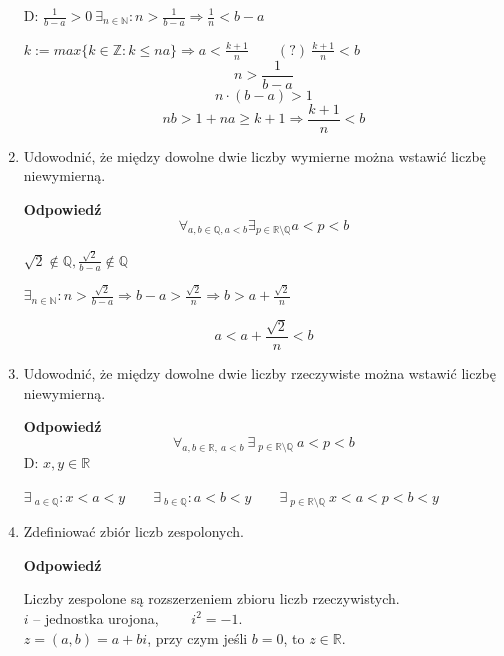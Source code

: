 \documentclass[12pt,a4paper]{article}
\theoremstyle{break}
\newcommand{\Odp}[1]{
		\begin{mdframed}[style=zadanie]
			\textbf{Odpowiedź}\\
			#1
		\end{mdframed}
	}
\begin{document}
\begin{enumerate}[1.]
{		D: $\frac{1}{b-a}>0\: \exists_{n\in\mathbb{N}}: n>\frac{1}{b-a} \Rightarrow \frac{1}{n}<b-a$
		
		$k:=max\{k\in\mathbb{Z}: k\leq na\} \Rightarrow a<\frac{k+1}{n}\qquad (?)\: \frac{k+1}{n}<b$
		$$n>\frac{1}{b-a}$$
		$$n\cdot(b-a)>1$$
		$$nb>1+na\geq k+1 \Rightarrow \frac{k+1}{n}<b$$
		 
	}
	\newpage
	\item Udowodnić, że między dowolne dwie liczby wymierne można wstawić liczbę niewymierną.
	\Odp{
		$$\forall_{a,b\in \mathbb{Q}, a<b} \exists_{p\in \mathbb{R}\setminus\mathbb{Q}} a<p<b$$
		
		$\sqrt{2}\notin\mathbb{Q}, \frac{\sqrt{2}}{b-a}\notin\mathbb{Q}$
		
		$\exists_{n\in\mathbb{N}}: n>\frac{\sqrt{2}}{b-a}\Rightarrow b-a > \frac{\sqrt{2}}{n} \Rightarrow b>a+\frac{\sqrt{2}}{n}$
		
		$$a<a+\frac{\sqrt{2}}{n}<b$$
	}
	
	\item Udowodnić, że między dowolne dwie liczby rzeczywiste można wstawić liczbę niewymierną.
	\Odp{
		$$\forall_{a,b\in \mathbb{R},\: a<b} \:\exists\:_{p\in \mathbb{R}\setminus\mathbb{Q}} \:a<p<b$$
		D: $x,y\in\mathbb{R}$
		
		$\exists\:_{a\in \mathbb{Q}}: x<a<y \qquad \exists\:_{b\in\mathbb{Q}} : a<b<y 
		\qquad\exists\:_{p\in \mathbb{R}\setminus\mathbb{Q}}\: x<a<p<b<y$
	}
	
	\item Zdefiniować zbiór liczb zespolonych.
	\Odp{
			\noindent
			\begin{minipage}[t]{0.55\textwidth}
				\vspace{0pt}  %
				Liczby zespolone są rozszerzeniem zbioru liczb rzeczywistych.\\[0.5em]
				$i$ – jednostka urojona,  $\qquad i^2 = -1$.\\[0.5em]
				$z = (a, b) = a + bi$, przy czym jeśli $b = 0$, to $z \in \mathbb{R}$.\\[0.5em]
				

\end{minipage}}
\end{enumerate}
\end{document}
